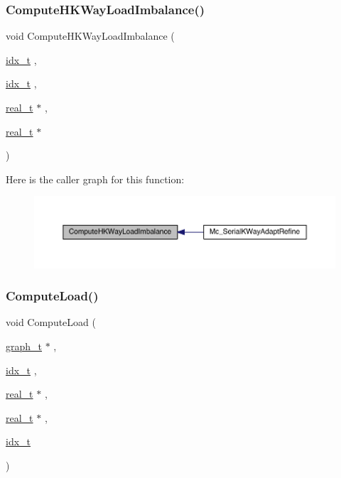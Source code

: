 \mbox{\label{a00951_af7ee094d9cdc65a5694a5373324527b2}} 
\subsubsection{\texorpdfstring{Compute\+H\+K\+Way\+Load\+Imbalance()}{ComputeHKWayLoadImbalance()}}
{\footnotesize\ttfamily void Compute\+H\+K\+Way\+Load\+Imbalance (\begin{DoxyParamCaption}\item[{\hyperlink{a00876_aaa5262be3e700770163401acb0150f52}{idx\+\_\+t}}]{,  }\item[{\hyperlink{a00876_aaa5262be3e700770163401acb0150f52}{idx\+\_\+t}}]{,  }\item[{\hyperlink{a00876_a1924a4f6907cc3833213aba1f07fcbe9}{real\+\_\+t} $\ast$}]{,  }\item[{\hyperlink{a00876_a1924a4f6907cc3833213aba1f07fcbe9}{real\+\_\+t} $\ast$}]{ }\end{DoxyParamCaption})}

Here is the caller graph for this function\+:\nopagebreak
\begin{figure}[H]
\begin{center}
\leavevmode
\includegraphics[width=350pt]{a00951_af7ee094d9cdc65a5694a5373324527b2_icgraph}
\end{center}
\end{figure}
\mbox{\label{a00951_a65ff55a45161e86e91c218af572b7787}} 
\subsubsection{\texorpdfstring{Compute\+Load()}{ComputeLoad()}}
{\footnotesize\ttfamily void Compute\+Load (\begin{DoxyParamCaption}\item[{\hyperlink{a00734}{graph\+\_\+t} $\ast$}]{,  }\item[{\hyperlink{a00876_aaa5262be3e700770163401acb0150f52}{idx\+\_\+t}}]{,  }\item[{\hyperlink{a00876_a1924a4f6907cc3833213aba1f07fcbe9}{real\+\_\+t} $\ast$}]{,  }\item[{\hyperlink{a00876_a1924a4f6907cc3833213aba1f07fcbe9}{real\+\_\+t} $\ast$}]{,  }\item[{\hyperlink{a00876_aaa5262be3e700770163401acb0150f52}{idx\+\_\+t}}]{ }\end{DoxyParamCaption})}

